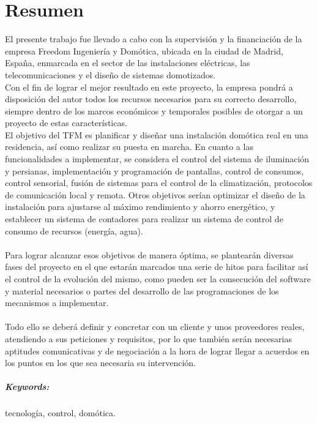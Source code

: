 
\chapter{Resumen}

El presente trabajo fue llevado a cabo con la supervisión y la financiación de la empresa Freedom Ingeniería y Domótica, ubicada en la ciudad de Madrid, España, enmarcada en el sector de las instalaciones eléctricas, las telecomunicaciones y el diseño de sistemas domotizados. \\
Con el fin de lograr el mejor resultado en este proyecto, la empresa pondrá a disposición del autor todos los recursos necesarios para su correcto desarrollo, siempre dentro de los marcos económicos y temporales posibles de otorgar a un proyecto de estas características.\\
 El objetivo del TFM es planificar y diseñar una instalación domótica real en una residencia, así como realizar su puesta en marcha. En cuanto a las funcionalidades a implementar, se considera el control del sistema de iluminación y persianas, implementación y programación de pantallas, control de consumos, control sensorial, fusión de sistemas para el control de la climatización, protocolos de comunicación local y remota. Otros objetivos serían optimizar el diseño de la instalación para ajustarse al máximo rendimiento y ahorro energético, y establecer un sistema de contadores para realizar un sistema de control de consumo de recursos (energía, agua). \\\\
Para lograr alcanzar esos objetivos de manera óptima, se plantearán diversas fases del proyecto en el que estarán marcados una serie de hitos para facilitar así el control de la evolución del mismo, como pueden ser la consecución del software y material necesarios o partes del desarrollo de las programaciones de los mecanismos a implementar.\\\\
Todo ello se deberá definir y concretar con un cliente y unos proveedores reales, atendiendo a sus peticiones y requisitos, por lo que también serán necesarias aptitudes comunicativas y de negociación a la hora de lograr llegar a acuerdos en los puntos en los que sea necesaria su intervención.

\paragraph{Keywords:} tecnología, control, domótica.


